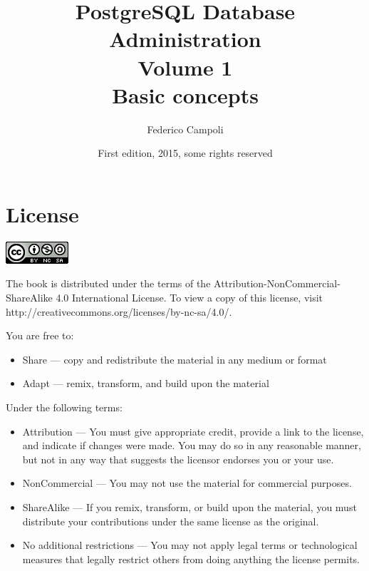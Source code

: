 \documentclass[oneside]{book}
\author{Federico Campoli}
\title{PostgreSQL Database Administration \\ Volume 1 \\ Basic concepts}
\date{First edition, 2015, some rights reserved}
\begin{document}

\maketitle



\chapter*{License}
\begin{center}
 \includegraphics{images/cc_logo.png}
\end{center}

The book is distributed under the terms of the Attribution-NonCommercial-ShareAlike 4.0 International 
License. To view a copy of this license, visit http://creativecommons.org/licenses/by-nc-sa/4.0/.\newline


You are free to:
\begin{itemize}
 
\item     Share — copy and redistribute the material in any medium or format
\item     Adapt — remix, transform, and build upon the material

\end{itemize}


Under the following terms:
\begin{itemize}
\item    Attribution — You must give appropriate credit, provide a link to the license, and indicate if 
changes were made. You may do so in any reasonable manner, but not in any way that suggests the licensor 
endorses you or your use.

\item    NonCommercial — You may not use the material for commercial purposes.

\item    ShareAlike — If you remix, transform, or build upon the material, you must distribute your 
contributions under the same license as the original.

\item    No additional restrictions — You may not apply legal terms or technological measures that legally 
restrict others from doing anything the license permits.

\end{itemize}
\end{document}
